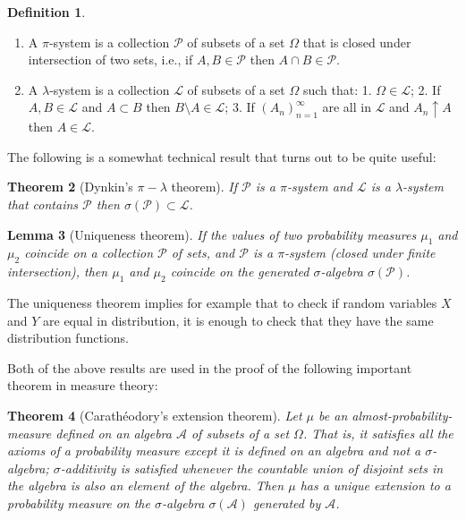 \documentclass[11pt]{report}
\providecommand{\cal}{\mathcal}
\theoremstyle{plain}
\newtheorem{thm}{Theorem}[chapter]
\newtheorem{lem}[thm]{Lemma}
\theoremstyle{definition}
\newtheorem{defn}[thm]{Definition}
\begin{document}
\begin{defn}

\begin{enumerate}[label=(\roman*)]
\item A $\pi$-system is a collection ${\cal P}$ of subsets
of a set $\Omega$ that is closed under intersection
of two sets, i.e., if $A,B\in {\cal P}$ then
$A\cap B\in {\cal P}$.

\item A $\lambda$-system is a collection ${\cal L}$ of
subsets of a set $\Omega$ such that: 1.
$\Omega \in {\cal L}$; 2. If $A,B\in {\cal L}$ and
$A\subset B$ then $B\setminus A\in {\cal L}$; 3. If
$(A_n)_{n=1}^\infty$ are all in ${\cal L}$ and
$A_n \uparrow A$ then $A\in {\cal L}$.
\end{enumerate}

\end{defn}

\noindent The following is a somewhat technical result that
turns out to be quite useful:

\begin{thm}[Dynkin's $\pi-\lambda$ theorem]
If ${\cal P}$ is a $\pi$-system and ${\cal L}$ is a
$\lambda$-system that contains ${\cal P}$ then
$\sigma({\cal P}) \subset {\cal L}$.
\end{thm}

\begin{lem}[Uniqueness theorem]
If the values of two probability measures $\mu_1$ and
$\mu_2$ coincide on a collection ${\cal P}$ of sets,
and ${\cal P}$ is a $\pi$-system (closed under finite
intersection), then $\mu_1$ and $\mu_2$ coincide on
the generated $\sigma$-algebra $\sigma({\cal P})$.
\end{lem}

\noindent The uniqueness theorem implies for example that to
check if random variables $X$ and $Y$ are equal in
distribution, it is enough to check that they have the
same distribution functions.

Both of the above results are used in the proof of
the following important theorem in measure theory:

\begin{thm}[Carathéodory's extension theorem]
Let $\mu$ be an almost-probability-measure defined on
an algebra ${\cal A}$ of subsets of a set $\Omega$.
That is, it satisfies all the axioms of a probability
measure except it is defined on an algebra and not a
$\sigma$-algebra; $\sigma$-additivity is satisfied
whenever the countable union of disjoint sets in the
algebra is also an element of the algebra. Then $\mu$
has a unique extension to a probability measure on the
$\sigma$-algebra $\sigma({\cal A})$ generated by
${\cal A}$.
\end{thm}
\end{document}

